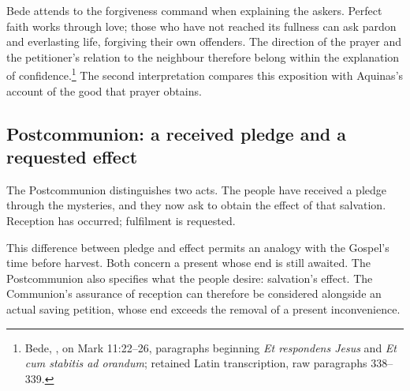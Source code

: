 Bede attends to the forgiveness command when explaining the askers.
Perfect faith works through love; those who have not reached its fullness
can ask pardon and everlasting life, forgiving their own offenders.
The direction of the prayer and the petitioner's relation to the
neighbour therefore belong within the explanation of confidence.\footnote{Bede,
, on Mark 11:22--26, paragraphs beginning
\textit{Et respondens Jesus} and \textit{Et cum stabitis ad orandum};
retained Latin transcription, raw paragraphs 338--339.}
The second interpretation compares this exposition with Aquinas's account
of the good that prayer obtains.

\subsection{Postcommunion: a received pledge and a requested effect}
The Postcommunion distinguishes two acts. The people have received a
pledge through the mysteries, and they now ask to obtain the effect of
that salvation. Reception has occurred; fulfilment is requested.

This difference between pledge and effect permits an analogy with the
Gospel's time before harvest. Both concern a present whose end is still
awaited. The Postcommunion also specifies what the people desire:
salvation's effect. The Communion's assurance of reception can therefore
be considered alongside an actual saving petition, whose end exceeds
the removal of a present inconvenience.
